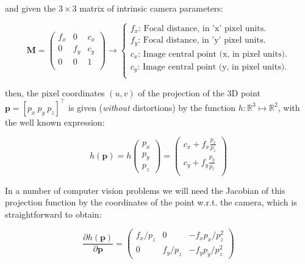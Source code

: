 \documentclass[a4paper,11pt]{report}
\begin{document}
\noindent and given the $3 \times 3$ matrix of intrinsic camera parameters:

\begin{equation}
\mathbf{M}=
\left( 
\begin{array}{ccc}
 f_x & 0 & c_x \\
  0  & f_y & c_y \\
 0 & 0 & 1 \\
\end{array}
\right)
\longrightarrow
\left\{
\begin{array}{l}
 f_x\text{: Focal distance, in 'x' pixel units.} \\
 f_y\text{: Focal distance, in 'y' pixel units.} \\
 c_x\text{: Image central point (x, in pixel units).} \\
 c_y\text{: Image central point (y, in pixel units).} \\
\end{array}
\right.
\end{equation}


\noindent then, the pixel coordinates $(u,v)$ of the projection of the 
3D point $\mathbf{p}=[p_x ~ p_y ~ p_z]^\top$
is given (\emph{without} distortions) by the function $h: \mathbb{R}^3 \mapsto \mathbb{R}^2$, 
with the well known expression:

\begin{equation}
h(\mathbf{p}) = 
h\left(
\begin{array}{c}
 p_x \\ p_y \\p_z
\end{array}
\right) = 
\left(
\begin{array}{c}
 c_x + f_x  \frac{p_x}{p_z} \\
 c_y + f_y  \frac{p_y}{p_z} \\
\end{array}
\right)
\end{equation}

In a number of computer vision problems we will need the Jacobian of this
projection function by the coordinates of the point w.r.t. the camera, which 
is straightforward to obtain:

\begin{equation}
\label{eq:jacob_pinhole}
\frac{\partial h(\mathbf{p})}{\partial \mathbf{p}} = 
\left(
\begin{array}{ccc}
 f_x/p_z  &    0    &  -f_x p_x/p_z^2   \\
 0 & f_y/p_z  &  -f_y p_y/ p_z^2   
\end{array}
\right)
\end{equation}
\end{document}
